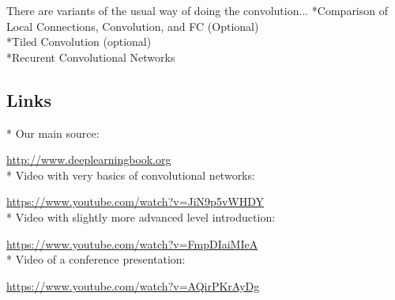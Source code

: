 \documentclass[]{article}
\begin{document}
There are variants of the usual way of doing the convolution...
\newline
*Comparison of Local Connections, Convolution, and FC (Optional)\\
*Tiled Convolution (optional)\\
*Recurent Convolutional Networks









\subsection{Links}
* Our main source:

\url{http://www.deeplearningbook.org}\\
* Video with very basics of convolutional networks:

\url{https://www.youtube.com/watch?v=JiN9p5vWHDY}\\
* Video with slightly more advanced level introduction:

\url{https://www.youtube.com/watch?v=FmpDIaiMIeA}\\
* Video of a conference presentation:

\url{https://www.youtube.com/watch?v=AQirPKrAyDg}
\end{document}
